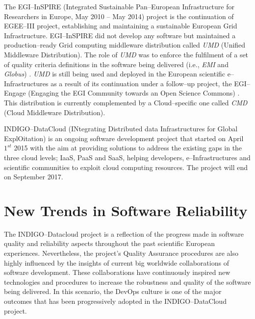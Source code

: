 \documentclass[journal]{IEEEtran}
\begin{document}
The EGI--InSPIRE (Integrated Sustainable Pan--European Infrastructure for Researchers in Europe, May 2010 -- May 2014) project \cite{cordis:egi-inspire} is the continuation of EGEE--III project, establishing and maintaining a sustainable European Grid Infrastructure. EGI--InSPIRE did not develop any software but maintained a production--ready Grid computing middleware distribution called {\sl UMD} (Unified Middleware Distribution). The role of {\sl UMD} was to enforce the fulfilment of a set of quality criteria definitions \cite{egi-qc} in the software being delivered (i.e., {\sl EMI} and {\sl Globus}) \cite{mario}. {\sl UMD} is still being used and deployed in the European scientific e--Infrastructures as a result of its continuation under a follow--up project, the EGI--Engage (Engaging the EGI Community towards an Open Science Commons) \cite{cordis:egi-engage}. This distribution is currently complemented by a Cloud--specific one called {\sl CMD} (Cloud Middleware Distribution).


INDIGO--DataCloud (INtegrating Distributed data Infrastructures for Global ExplOitation) \cite{cordis:indigo} is an ongoing software development project that started on April $1^{st}$ 2015 with the aim at providing solutions to address the existing gaps in the three cloud levels; IaaS, PaaS and SaaS, helping developers, e--Infrastructures and scientific communities to exploit cloud computing resources. The project will end on September 2017.

\section{New Trends in Software Reliability}

The INDIGO--Datacloud project is a reflection of the progress made in software quality and reliability aspects throughout the past scientific European experiences. Nevertheless, the project’s Quality Assurance procedures are also highly influenced by the insights of current big worldwide collaborations of software development. These collaborations have continuously inspired new technologies and procedures to increase the robustness and quality of the software being delivered. In this scenario, the DevOps culture is one of the major outcomes that has been progressively adopted in the INDIGO--DataCloud project.
\end{document}
